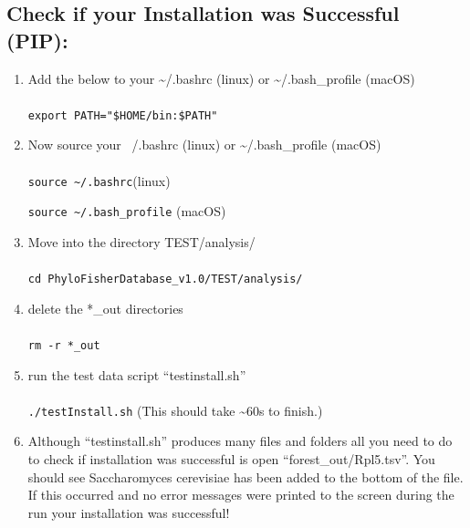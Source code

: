 \documentclass{article}
\def\code#1{\texttt{#1}}
\begin{document}
    \subsection{Check if your Installation was Successful (PIP):}
    \begin{enumerate}
        \item Add the below to your \textasciitilde/.bashrc (linux) or \textasciitilde/.bash\_profile (macOS)
        \\\\
        \code{export PATH="\$HOME/bin:\$PATH"}
        \item Now source your ~/.bashrc (linux) or \textasciitilde/.bash\_profile (macOS)
        \\\\
        \code{source   \textasciitilde/.bashrc}(linux)
        
        \code{source   \textasciitilde/.bash\_profile} (macOS)
        \item Move into the directory TEST/analysis/
        \\\\
        \code{cd PhyloFisherDatabase\_v1.0/TEST/analysis/}
        \item delete the *\_out directories
        \\\\
        \code{rm -r *\_out}
        \item run the test data script “testinstall.sh” 
        \\\\
        \code{./testInstall.sh} (This should take \textasciitilde60s to finish.)
        \item Although “testinstall.sh” produces many files and folders all you need to do to check if installation was successful is open “forest\_out/Rpl5.tsv”. You should see Saccharomyces cerevisiae has been added to the bottom of the file. If this occurred and no error messages were printed to the screen during the run your installation was successful!
    \end{enumerate}
    
\end{document}
